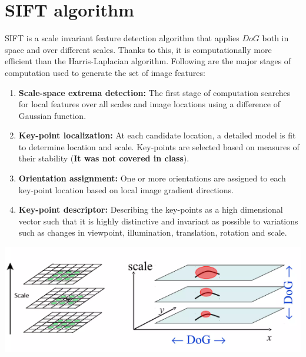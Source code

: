 \section{SIFT algorithm}
SIFT is a scale invariant feature detection algorithm that applies $DoG$ both in space and over different scales. Thanks to this, it is computationally more efficient than the Harris-Laplacian algorithm. Following are the major stages of computation used to generate the set of image features:
\begin{enumerate}
    \item \textbf{Scale-space extrema detection:} The first stage of computation searches for local features over all scales and image locations using a difference of Gaussian function.
    \item \textbf{Key-point localization:} At each candidate location, a detailed model is fit to determine location and scale. Key-points are selected based on measures of their stability (\textbf{It was not covered in class}).
    \item \textbf{Orientation assignment:} One or more orientations are assigned to each key-point location based on local image gradient directions.
    \item \textbf{Key-point descriptor:} Describing the key-points as a high dimensional vector such that it is highly distinctive and invariant as possible to variations such as changes in viewpoint, illumination, translation, rotation and scale.
\end{enumerate}
\begin{center}
    \includegraphics[]{images/DoG space scales.png}
\end{center}
